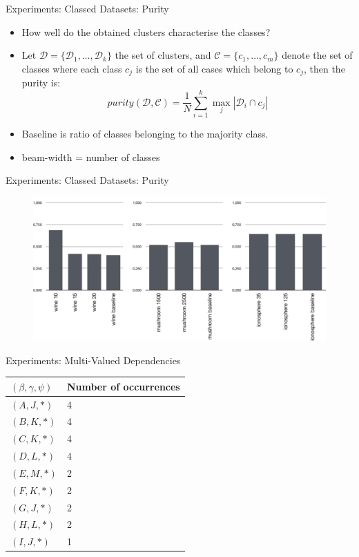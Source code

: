 \documentclass{beamer}
\newcommand{\dataset}{\mathcal{D}}
\begin{document}
\begin{frame}{Experiments: Classed Datasets: Purity}
	\begin{itemize}
		\item How well do the obtained clusters characterise the classes? 
		\item Let $\mathscr{D} = \{\dataset_1, \ldots, \dataset_k\}$ the set of clusters, and $\mathscr{C} = \{c_1, \ldots, c_m\}$ denote the set of classes where each class $c_j$ is the set of all cases which belong to $c_j$, then the purity is:
		\[purity(\mathscr{D}, \mathscr{C}) = \frac{1}{N}\sum\limits_{i=1}^{k}\max_j|\dataset_i \cap c_j|\]
		\item Baseline is ratio of classes belonging to the majority class.
		\item beam-width = number of classes
	\end{itemize}
\end{frame}

\begin{frame}{Experiments: Classed Datasets: Purity}

\begin{figure}[H]
  \centering
  \includegraphics[width=\textwidth]{img/purity}
\end{figure}
\end{frame}

\begin{frame}{Experiments: Multi-Valued Dependencies}
\begin{table}[H]
\centering
\begin{tabular}{l|l}
$(\beta, \gamma, \psi)$ & Number of occurrences  \\ \hline
$(A,J,*)$               & 4                      \\
$(B,K,*)$               & 4                      \\
$(C,K,*)$               & 4                      \\
$(D,L,*)$               & 4                      \\
$(E,M,*)$               & 2                      \\
$(F,K,*)$               & 2                      \\
$(G,J,*)$               & 2                      \\
$(H,L,*)$               & 2                      \\
$(I,J,*)$               & 1                      
\end{tabular}
\end{table}
\end{frame}
\end{document}
